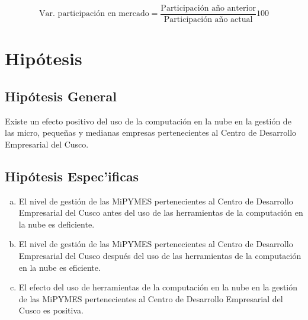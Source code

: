 \begin{equation}\label{eq:competitividad2}
    \text{Var. participación en mercado} = \frac{\text{Participación año anterior}}{\text{Participación año actual}}\text{100}
\end{equation}

\newpage
\section{Hipótesis}

\subsection{Hipótesis General}

Existe un efecto positivo del uso de la computación en la nube en la
gestión de las micro, pequeñas y medianas empresas pertenecientes al Centro de
Desarrollo Empresarial del Cusco.

\subsection{Hipótesis Espec'ificas}
\begin{enumerate}[a., noitemsep]
    \item El nivel de gestión de las MiPYMES pertenecientes al Centro de Desarrollo
          Empresarial del Cusco antes del uso de las herramientas de la computación
          en la nube es deficiente.
    \item El nivel de gestión de las MiPYMES pertenecientes al Centro de Desarrollo
          Empresarial del Cusco después del uso de las herramientas de la computación
          en la nube es eficiente.
    \item El efecto del uso de herramientas de la computación en la nube en la
          gestión de las MiPYMES pertenecientes al Centro de Desarrollo Empresarial
          del Cusco es positiva.
\end{enumerate}

